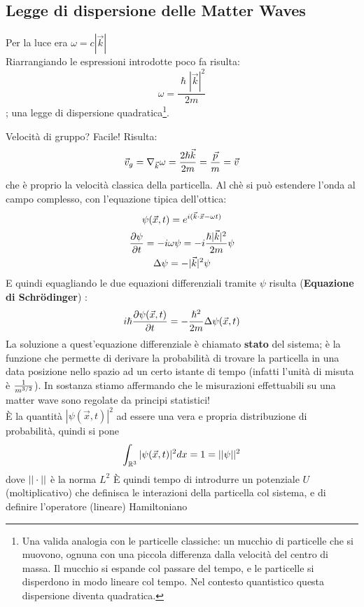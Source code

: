 \subsection{Legge di dispersione delle Matter Waves} 
Per la luce era \( \omega = c|\vec k| \)\\
Riarrangiando le espressioni introdotte poco fa risulta:
\[
	\omega = \frac{\hslash|\vec k|^2}{2m}
\]
; una legge di dispersione quadratica\footnote{Una valida analogia con le particelle classiche: un mucchio di particelle che si muovono, ognuna con una piccola differenza dalla velocità del centro di massa. Il mucchio si espande col passare del tempo, e le particelle si disperdono in modo lineare col tempo. Nel contesto quantistico questa dispersione diventa quadratica.}.

Velocità di gruppo? Facile! Risulta:
\[
	\vec v_g = \nabla _{\vec k} \omega = \frac{2 \hslash \vec k}{2 m} = \frac{\vec p}{m} = \vec v
\]
che è proprio la velocità classica della particella. Al chè si può estendere l'onda al campo complesso, con l'equazione tipica dell'ottica:
\begin{gather*}
	\psi(\vec x, t) = e^{i(\vec k \cdot \vec x - \omega t)} \\
	\frac{\partial \psi}{\partial t} = -i\omega \psi = -i\frac{\hslash|\vec k|^2}{2m}\psi \\
	\Delta \psi = -|\vec k|^2\psi
\end{gather*}
E quindi equagliando le due equazioni differenziali tramite $\psi$ risulta (\textbf{Equazione di Schrödinger}) :
\begin{equation}
	i\hslash \frac{\partial \psi (\vec x, t)}{\partial t} = - \frac{\hslash^2}{2m} \Delta \psi(\vec x, t)
\end{equation}
La soluzione a quest'equazione differenziale è chiamato \textbf{stato} del sistema; è la funzione che permette di derivare la probabilità di trovare la particella in una data posizione nello spazio ad un certo istante di tempo (infatti l'unità di misuta è $\frac{1}{m^{3/2}}$).
In sostanza stiamo affermando che le misurazioni effettuabili su una matter wave sono regolate da principi statistici! \\
È la quantità $|\psi(\vec x, t)|^2 $ ad essere una vera e propria distribuzione di probabilità, quindi si pone
\[
	\int_{\mathbb{R}^3} |\psi(\vec x, t)|^2 dx = 1 = ||\psi||^2
\]
dove $||\cdot||$ è la norma $L^2$
È quindi tempo di introdurre un potenziale $U$ (moltiplicativo) che definisca le interazioni della particella col sistema, e di definire l'operatore (lineare) Hamiltoniano 
